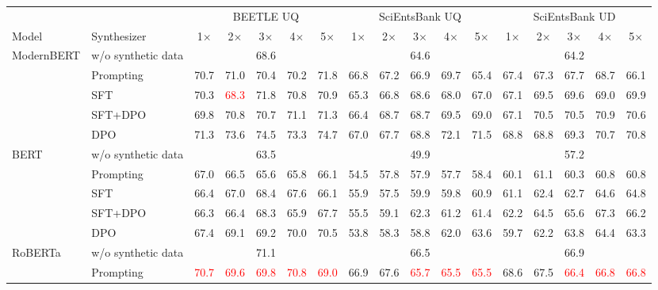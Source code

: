 \begin{table}[t]
\centering
\footnotesize
\setlength{\tabcolsep}{2pt}
\begin{tabular}{llccccccccccccccc}
\toprule
 & & \multicolumn{5}{c}{BEETLE UQ} & \multicolumn{5}{c}{SciEntsBank UQ} & \multicolumn{5}{c}{SciEntsBank UD} \\
\cmidrule(lr){3-7}\cmidrule(lr){8-12}\cmidrule(lr){13-17}
Model & Synthesizer & 1$\times$ & 2$\times$ & 3$\times$ & 4$\times$ & 5$\times$ & 1$\times$ & 2$\times$ & 3$\times$ & 4$\times$ & 5$\times$ & 1$\times$ & 2$\times$ & 3$\times$ & 4$\times$ & 5$\times$ \\
\midrule
\multirow{5}{*}{ModernBERT} & w/o synthetic data & \multicolumn{5}{c}{68.6} & \multicolumn{5}{c}{64.6} & \multicolumn{5}{c}{64.2} \\
 & Prompting & 70.7 & 71.0 & 70.4 & 70.2 & 71.8 & 66.8 & 67.2 & 66.9 & 69.7 & 65.4 & 67.4 & 67.3 & 67.7 & 68.7 & 66.1 \\
 & SFT & 70.3 & \textcolor{red}{68.3} & 71.8 & 70.8 & 70.9 & 65.3 & 66.8 & 68.6 & 68.0 & 67.0 & 67.1 & 69.5 & 69.6 & 69.0 & 69.9 \\
 & SFT+DPO & 69.8 & 70.8 & 70.7 & 71.1 & 71.3 & 66.4 & 68.7 & 68.7 & 69.5 & 69.0 & 67.1 & 70.5 & 70.5 & 70.9 & 70.6 \\
 & DPO & 71.3 & 73.6 & 74.5 & 73.3 & 74.7 & 67.0 & 67.7 & 68.8 & 72.1 & 71.5 & 68.8 & 68.8 & 69.3 & 70.7 & 70.8 \\
\midrule
\multirow{5}{*}{BERT} & w/o synthetic data & \multicolumn{5}{c}{63.5} & \multicolumn{5}{c}{49.9} & \multicolumn{5}{c}{57.2} \\
 & Prompting & 67.0 & 66.5 & 65.6 & 65.8 & 66.1 & 54.5 & 57.8 & 57.9 & 57.7 & 58.4 & 60.1 & 61.1 & 60.3 & 60.8 & 60.8 \\
 & SFT & 66.4 & 67.0 & 68.4 & 67.6 & 66.1 & 55.9 & 57.5 & 59.9 & 59.8 & 60.9 & 61.1 & 62.4 & 62.7 & 64.6 & 64.8 \\
 & SFT+DPO & 66.3 & 66.4 & 68.3 & 65.9 & 67.7 & 55.5 & 59.1 & 62.3 & 61.2 & 61.4 & 62.2 & 64.5 & 65.6 & 67.3 & 66.2 \\
 & DPO & 67.4 & 69.1 & 69.2 & 70.0 & 70.5 & 53.8 & 58.3 & 58.8 & 62.0 & 63.6 & 59.7 & 62.2 & 63.8 & 64.4 & 63.3 \\
\midrule
\multirow{5}{*}{RoBERTa} & w/o synthetic data & \multicolumn{5}{c}{71.1} & \multicolumn{5}{c}{66.5} & \multicolumn{5}{c}{66.9} \\
 & Prompting & \textcolor{red}{70.7} & \textcolor{red}{69.6} & \textcolor{red}{69.8} & \textcolor{red}{70.8} & \textcolor{red}{69.0} & 66.9 & 67.6 & \textcolor{red}{65.7} & \textcolor{red}{65.5} & \textcolor{red}{65.5} & 68.6 & 67.5 & \textcolor{red}{66.4} & \textcolor{red}{66.8} & \textcolor{red}{66.8} \\

\end{tabular}
\end{table}

